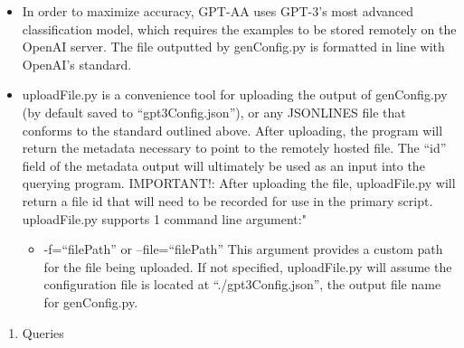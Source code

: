 \documentclass[
]{article}
\begin{document}
\begin{itemize}
\item
  In order to maximize accuracy, GPT-AA uses GPT-3's most advanced
  classification model, which requires the examples to be stored
  remotely on the OpenAI server. The file outputted by genConfig.py is
  formatted in line with OpenAI's standard.
\item
  uploadFile.py is a convenience tool for uploading the output of
  genConfig.py (by default saved to ``gpt3Config.json''), or any
  JSONLINES file that conforms to the standard outlined above. After
  uploading, the program will return the metadata necessary to point to
  the remotely hosted file. The ``id'' field of the metadata output will
  ultimately be used as an input into the querying program. IMPORTANT!:
  After uploading the file, uploadFile.py will return a file id that
  will need to be recorded for use in the primary script. uploadFile.py
  supports 1 command line argument:"

  \begin{itemize}
  \itemsep1pt\parskip0pt
  \item
    -f=``filePath'' or --file=``filePath'' This argument provides a
    custom path for the file being uploaded. If not specified,
    uploadFile.py will assume the configuration file is located at
    ``./gpt3Config.json'', the output file name for genConfig.py.
  \end{itemize}
\end{itemize}

\begin{enumerate}
\def\labelenumi{\arabic{enumi}.}
\setcounter{enumi}{3}
\itemsep1pt\parskip0pt
\item
  Queries
\end{enumerate}
\end{document}
